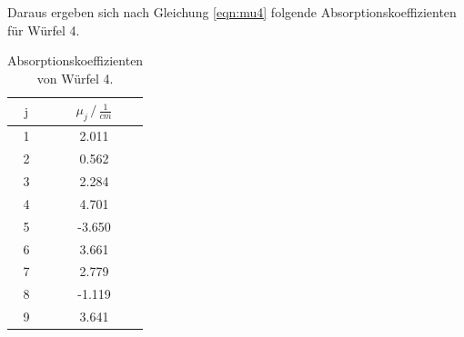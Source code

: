 \noindent
Daraus ergeben sich nach Gleichung \ref{eqn:mu4} folgende Absorptionskoeffizienten für Würfel 4.

    \begin{table}
      \centering
      \begin{tabular}{c c}
      \toprule
      $\text{j}$ & $\mu_j \,/\, \frac{1}{cm}$ \\
       \midrule 
    1  & 2.011  \\
    2  & 0.562  \\
    3  & 2.284   \\
    4  & 4.701  \\
    5  & -3.650   \\
    6  & 3.661  \\
    7  & 2.779   \\
    8  & -1.119  \\
    9  & 3.641   \\

      \bottomrule
      \end{tabular}
      \label{tab:w3}
      \caption{Absorptionskoeffizienten von Würfel 4.}
      \end{table}